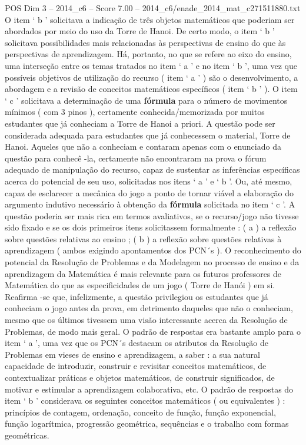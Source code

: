 \begin{textsample}{POS Dim 3 – 2014\_c6 – Score 7.00 – 2014\_c6/enade\_2014\_mat\_c271511880.txt}
O item ‘ b ’ solicitava a indicação de três objetos matemáticos que poderiam ser abordados por meio do uso da Torre de Hanoi.
De certo modo, o item ‘ b ’ solicitava possibilidades mais relacionadas às perspectivas de ensino do que às perspectivas de aprendizagem.
Há, portanto, no que se refere ao eixo do ensino, uma interseção entre os temas tratados no item ‘ a ’ e no item ‘ b ’, uma vez que possíveis objetivos de utilização do recurso ( item ‘ a ’ ) são o desenvolvimento, a abordagem e a revisão de conceitos matemáticos específicos ( item ‘ b ’ ).
O item ‘ c ’ solicitava a determinação de uma \textbf{fórmula} para o número de movimentos mínimos ( com 3 pinos ), certamente conhecida/memorizada por muitos estudantes que já conheciam a Torre de Hanoi a priori.
A questão pode ser considerada adequada para estudantes que já conhecessem o material, Torre de Hanoi.
Aqueles que não a conheciam e contaram apenas com o enunciado da questão para conhecê -la, certamente não encontraram na prova o fórum adequado de manipulação do recurso, capaz de sustentar as inferências específicas acerca do potencial de seu uso, solicitadas nos itens ‘ a ’ e ‘ b ’.
Ou, até mesmo, capaz de esclarecer a mecânica do jogo a ponto de tornar viável a elaboração do argumento indutivo necessário à obtenção da \textbf{fórmula} solicitada no item ‘ c ’.
A questão poderia ser mais rica em termos avaliativos, se o recurso/jogo não tivesse sido fixado e se os dois primeiros itens solicitassem formalmente : ( a ) a reflexão sobre questões relativas ao ensino ; ( b ) a reflexão sobre questões relativas à aprendizagem ( ambos exigindo apontamentos dos PCN´s ).
O reconhecimento do potencial da Resolução de Problemas e da Modelagem no processo de ensino e da aprendizagem da Matemática é mais relevante para os futuros professores de Matemática do que as especificidades de um jogo ( Torre de Hanói ) em si.
Reafirma -se que, infelizmente, a questão privilegiou os estudantes que já conheciam o jogo antes da prova, em detrimento daqueles que não o conheciam, mesmo que os últimos tivessem uma visão interessante acerca da Resolução de Problemas, de modo mais geral.
O padrão de respostas era bastante amplo para o item ‘ a ’, uma vez que os PCN´s destacam os atributos da Resolução de Problemas em vieses de ensino e aprendizagem, a saber : a sua natural capacidade de introduzir, construir e revisitar conceitos matemáticos, de contextualizar práticas e objetos matemáticos, de construir significados, de motivar e estimular a aprendizagem colaborativa, etc.
O padrão de respostas do item ‘ b ’ considerava os seguintes conceitos matemáticos ( ou equivalentes ) : princípios de contagem, ordenação, conceito de função, função exponencial, função logarítmica, progressão geométrica, sequências e o trabalho com formas geométricas.

\end{textsample}
